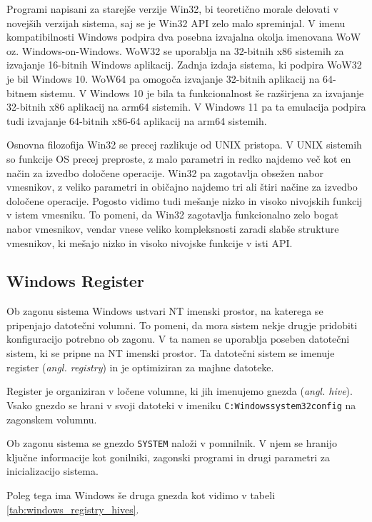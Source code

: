 \documentclass[a4paper,12pt,openright]{book}
\begin{document}
Programi napisani za starejše verzije Win32, bi teoretično morale delovati v novejših verzijah sistema, saj se je Win32 API zelo malo spreminjal.
V imenu kompatibilnosti Windows podpira dva posebna izvajalna okolja imenovana WoW oz. Windows-on-Windows.
WoW32 se uporablja na 32-bitnih x86 sistemih za izvajanje 16-bitnih Windows aplikacij. Zadnja izdaja sistema, ki podpira WoW32 je bil Windows 10.
WoW64 pa omogoča izvajanje 32-bitnih aplikacij na 64-bitnem sistemu.
V Windows 10 je bila ta funkcionalnost še razširjena za izvajanje 32-bitnih x86 aplikacij na arm64 sistemih.
V Windows 11 pa ta emulacija podpira tudi izvajanje 64-bitnih x86-64 aplikacij na arm64 sistemih.

Osnovna filozofija Win32 se precej razlikuje od UNIX pristopa.
V UNIX sistemih so funkcije OS precej preproste, z malo parametri in redko najdemo več kot en način za izvedbo določene operacije.
Win32 pa zagotavlja obsežen nabor vmesnikov, z veliko parametri in običajno najdemo tri ali štiri načine za izvedbo določene operacije.
Pogosto vidimo tudi mešanje nizko in visoko nivojskih funkcij v istem vmesniku.
To pomeni, da Win32 zagotavlja funkcionalno zelo bogat nabor vmesnikov, vendar vnese veliko kompleksnosti zaradi slabše strukture vmesnikov, ki mešajo nizko in visoko nivojske funkcije v isti API.
\cite{Tanenbaum_Bos_2023}

\subsection{Windows Register}

Ob zagonu sistema Windows ustvari NT imenski prostor, na katerega se pripenjajo datotečni volumni.
To pomeni, da mora sistem nekje drugje pridobiti konfiguracijo potrebno ob zagonu.
V ta namen se uporablja poseben datotečni sistem, ki se pripne na NT imenski prostor.
Ta datotečni sistem se imenuje register (\textit{angl. registry}) in je optimiziran za majhne datoteke.

Register je organiziran v ločene volumne, ki jih imenujemo gnezda (\textit{angl. hive}).
Vsako gnezdo se hrani v svoji datoteki v imeniku \texttt{C:Windowssystem32config} na zagonskem volumnu.

Ob zagonu sistema se gnezdo \texttt{SYSTEM} naloži v pomnilnik.
V njem se hranijo ključne informacije kot gonilniki, zagonski programi in drugi parametri za inicializacijo sistema.

Poleg tega ima Windows še druga gnezda kot vidimo v tabeli \ref{tab:windows_registry_hives}.
\end{document}
